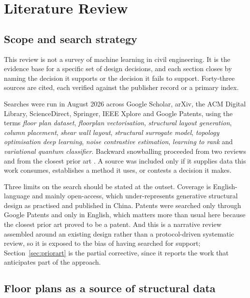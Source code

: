 \chapter{Literature Review}
\label{ch:literature}

\section{Scope and search strategy}

This review is not a survey of machine learning in civil engineering. It is
the evidence base for a specific set of design decisions, and each section
closes by naming the decision it supports or the decision it fails to
support. Forty-three sources are cited, each verified against the
publisher record or a primary index.

Searches were run in August 2026 across Google Scholar, arXiv, the ACM
Digital Library, ScienceDirect, Springer, IEEE Xplore and Google Patents,
using the terms \emph{floor plan dataset}, \emph{floorplan
vectorisation}, \emph{structural layout generation}, \emph{column
placement}, \emph{shear wall layout}, \emph{structural surrogate model},
\emph{topology optimisation deep learning}, \emph{noise contrastive
estimation}, \emph{learning to rank} and \emph{variational quantum
classifier}. Backward snowballing proceeded from two reviews
\citep{sun2021mlreview,malaga2022opinionated} and from the closest prior
art \citep{wang2024columnrl,liao2021shearwallgan}. A source was included
only if it supplies data this work consumes, establishes a method it uses,
or contests a decision it makes.

Three limits on the search should be stated at the outset. Coverage is
English-language and mainly open-access, which under-represents generative
structural design as practised and published in China. Patents were
searched only through Google Patents and only in English, which matters
more than usual here because the closest prior art proved to be a patent.
And this is a narrative review assembled around an existing design rather
than a protocol-driven systematic review, so it is exposed to the bias of
having searched for support; Section~\ref{sec:priorart} is the partial
corrective, since it reports the work that anticipates part of the
approach.

\section{Floor plans as a source of structural data}

